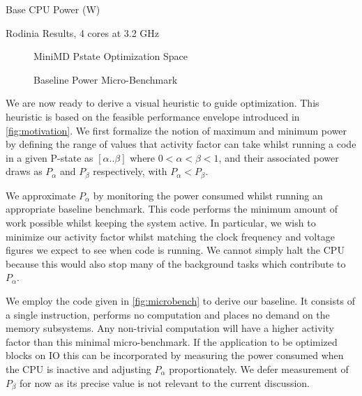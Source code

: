 \begin{table}
\centering

\caption{Base CPU Power (W)}
\end{table} 

\begin{table}
\centering

\caption{Rodinia Results, 4 cores at 3.2 GHz}
\end{table} 


\begin{figure}
\centering

\caption{MiniMD Pstate Optimization Space}
\label{fig:minimd-pstates}
\end{figure}


\begin{figure}[ht]                                                               
\centering                                                                      
\lstset{basicstyle=\ttfamily\footnotesize\bfseries, frame=tb} %
              
\caption{Baseline Power Micro-Benchmark}                            
\label{fig:microbench}                                                           
\end{figure}  



We are now ready to derive a visual heuristic to guide optimization. This heuristic is based on the feasible performance envelope introduced in \autoref{fig:motivation}. We first formalize the notion of maximum and minimum power by defining the range of values that activity factor can take whilst running a code in a given P-state as $[\alpha  .. \beta]$ where $0 < \alpha < \beta < 1$, and their associated power draws as $P_{\alpha}$ and $P_{\beta}$ respectively, with $P_{\alpha} < P_{\beta}$. 


We approximate $P_{\alpha}$ by monitoring the power consumed whilst running an appropriate baseline benchmark. This code performs the minimum amount of work possible whilst keeping the system active. In particular, we wish to minimize our activity factor whilst matching the clock frequency and voltage figures we expect to see when code is running. We cannot simply halt the CPU because this would also stop many of the background tasks which contribute to $P_{\alpha}$.

We employ the code given in \autoref{fig:microbench} to derive our baseline.  It consists of a single instruction, performs no computation and places no demand on the memory subsystems. Any non-trivial computation will have a higher activity factor than this minimal micro-benchmark. If the application to be optimized blocks on IO this can be incorporated by measuring the power consumed when the CPU is inactive and adjusting $P_\alpha$ proportionately. We defer measurement of $P_{\beta}$ for now as its precise value is not relevant to the current discussion. 
